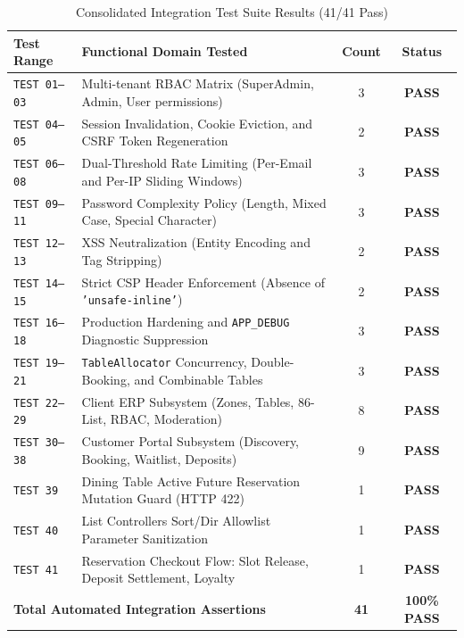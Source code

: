 \begin{table}[htbp]
\centering
\caption{Consolidated Integration Test Suite Results (41/41 Pass)}
\label{tab:integration_test_matrix_full}
\small
\begin{tabularx}{\textwidth}{lp{6.2cm}cc}
\toprule
\textbf{Test Range} & \textbf{Functional Domain Tested} & \textbf{Count} & \textbf{Status} \\
\midrule
\texttt{TEST 01--03} & Multi-tenant RBAC Matrix (SuperAdmin, Admin, User permissions) & 3 & \textbf{PASS} \\
\texttt{TEST 04--05} & Session Invalidation, Cookie Eviction, and CSRF Token Regeneration & 2 & \textbf{PASS} \\
\texttt{TEST 06--08} & Dual-Threshold Rate Limiting (Per-Email and Per-IP Sliding Windows) & 3 & \textbf{PASS} \\
\texttt{TEST 09--11} & Password Complexity Policy (Length, Mixed Case, Special Character) & 3 & \textbf{PASS} \\
\texttt{TEST 12--13} & XSS Neutralization (Entity Encoding and Tag Stripping) & 2 & \textbf{PASS} \\
\texttt{TEST 14--15} & Strict CSP Header Enforcement (Absence of \texttt{'unsafe-inline'}) & 2 & \textbf{PASS} \\
\texttt{TEST 16--18} & Production Hardening and \texttt{APP\_DEBUG} Diagnostic Suppression & 3 & \textbf{PASS} \\
\texttt{TEST 19--21} & \texttt{TableAllocator} Concurrency, Double-Booking, and Combinable Tables & 3 & \textbf{PASS} \\
\texttt{TEST 22--29} & Client ERP Subsystem (Zones, Tables, 86-List, RBAC, Moderation) & 8 & \textbf{PASS} \\
\texttt{TEST 30--38} & Customer Portal Subsystem (Discovery, Booking, Waitlist, Deposits) & 9 & \textbf{PASS} \\
\texttt{TEST 39} & Dining Table Active Future Reservation Mutation Guard (HTTP 422) & 1 & \textbf{PASS} \\
\texttt{TEST 40} & List Controllers Sort/Dir Allowlist Parameter Sanitization & 1 & \textbf{PASS} \\
\texttt{TEST 41} & Reservation Checkout Flow: Slot Release, Deposit Settlement, Loyalty & 1 & \textbf{PASS} \\
\midrule
\multicolumn{2}{l}{\textbf{Total Automated Integration Assertions}} & \textbf{41} & \textbf{100\% PASS} \\
\bottomrule
\end{tabularx}
\end{table}


